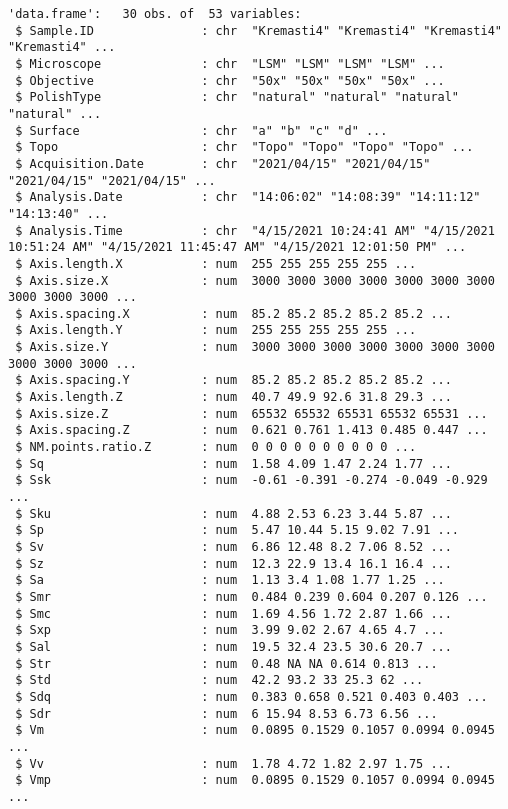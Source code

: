 \documentclass[
]{article}
\begin{document}
\begin{verbatim}
'data.frame':   30 obs. of  53 variables:
 $ Sample.ID               : chr  "Kremasti4" "Kremasti4" "Kremasti4" "Kremasti4" ...
 $ Microscope              : chr  "LSM" "LSM" "LSM" "LSM" ...
 $ Objective               : chr  "50x" "50x" "50x" "50x" ...
 $ PolishType              : chr  "natural" "natural" "natural" "natural" ...
 $ Surface                 : chr  "a" "b" "c" "d" ...
 $ Topo                    : chr  "Topo" "Topo" "Topo" "Topo" ...
 $ Acquisition.Date        : chr  "2021/04/15" "2021/04/15" "2021/04/15" "2021/04/15" ...
 $ Analysis.Date           : chr  "14:06:02" "14:08:39" "14:11:12" "14:13:40" ...
 $ Analysis.Time           : chr  "4/15/2021 10:24:41 AM" "4/15/2021 10:51:24 AM" "4/15/2021 11:45:47 AM" "4/15/2021 12:01:50 PM" ...
 $ Axis.length.X           : num  255 255 255 255 255 ...
 $ Axis.size.X             : num  3000 3000 3000 3000 3000 3000 3000 3000 3000 3000 ...
 $ Axis.spacing.X          : num  85.2 85.2 85.2 85.2 85.2 ...
 $ Axis.length.Y           : num  255 255 255 255 255 ...
 $ Axis.size.Y             : num  3000 3000 3000 3000 3000 3000 3000 3000 3000 3000 ...
 $ Axis.spacing.Y          : num  85.2 85.2 85.2 85.2 85.2 ...
 $ Axis.length.Z           : num  40.7 49.9 92.6 31.8 29.3 ...
 $ Axis.size.Z             : num  65532 65532 65531 65532 65531 ...
 $ Axis.spacing.Z          : num  0.621 0.761 1.413 0.485 0.447 ...
 $ NM.points.ratio.Z       : num  0 0 0 0 0 0 0 0 0 0 ...
 $ Sq                      : num  1.58 4.09 1.47 2.24 1.77 ...
 $ Ssk                     : num  -0.61 -0.391 -0.274 -0.049 -0.929 ...
 $ Sku                     : num  4.88 2.53 6.23 3.44 5.87 ...
 $ Sp                      : num  5.47 10.44 5.15 9.02 7.91 ...
 $ Sv                      : num  6.86 12.48 8.2 7.06 8.52 ...
 $ Sz                      : num  12.3 22.9 13.4 16.1 16.4 ...
 $ Sa                      : num  1.13 3.4 1.08 1.77 1.25 ...
 $ Smr                     : num  0.484 0.239 0.604 0.207 0.126 ...
 $ Smc                     : num  1.69 4.56 1.72 2.87 1.66 ...
 $ Sxp                     : num  3.99 9.02 2.67 4.65 4.7 ...
 $ Sal                     : num  19.5 32.4 23.5 30.6 20.7 ...
 $ Str                     : num  0.48 NA NA 0.614 0.813 ...
 $ Std                     : num  42.2 93.2 33 25.3 62 ...
 $ Sdq                     : num  0.383 0.658 0.521 0.403 0.403 ...
 $ Sdr                     : num  6 15.94 8.53 6.73 6.56 ...
 $ Vm                      : num  0.0895 0.1529 0.1057 0.0994 0.0945 ...
 $ Vv                      : num  1.78 4.72 1.82 2.97 1.75 ...
 $ Vmp                     : num  0.0895 0.1529 0.1057 0.0994 0.0945 ...

\end{verbatim}
\end{document}
